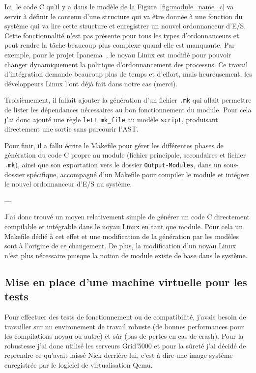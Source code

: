 Ici, le code C qu'il y a dans le modèle de la Figure~\ref{fig:module_name_c} va 
servir à définir le contenu d'une structure qui va être donnée à une fonction 
du système qui va lire cette structure et enregistrer un nouvel ordonnanceur 
d'E/S. Cette fonctionnalité n'est pas présente pour tous les types 
d'ordonnanceurs et peut rendre la tâche beaucoup plus complexe quand elle est 
manquante. Par exemple, pour le projet Ipanema~\cite{lepers2020provable}, le 
noyau Linux est modifié pour pouvoir changer dynamiquement la politique 
d'ordonnancement des processus. Ce travail d'intégration demande beaucoup plus 
de temps et d'effort, mais heureusement, les développeurs Linux l'ont déjà fait 
dans notre cas (merci).

Troisièmement, il fallait ajouter la génération d'un fichier \texttt{.mk} qui 
allait permettre de lister les dépendances nécessaires au bon fonctionnement du 
module. Pour cela j'ai donc ajouté une règle \texttt{let! mk\_file} au modèle 
\texttt{script}, produisant directement une sortie sans parcourir l'AST.

Pour finir, il a fallu écrire le Makefile pour gérer les différentes phases de 
génération du code C propre au module (fichier principale, secondaires et 
fichier \texttt{.mk}), ainsi que son exportation vers le dossier \texttt
{Output-Modules}, dans un sous-dossier spécifique, accompagné d'un Makefile 
pour compiler le module et intégrer le nouvel ordonnanceur d'E/S au système.

\begin{center}
---
\end{center}
    
J'ai donc trouvé un moyen relativement simple de générer un code C directement 
compilable et intégrable dans le noyau Linux en tant que module. Pour cela un 
Makefile dédié à cet effet et une modification de la génération par les modèles 
sont à l'origine de ce changement. De plus, la modification d'un noyau Linux 
n'est plus nécessaire puisque la notion de module existe de base dans le 
système.

\subsection{Mise en place d'une machine virtuelle pour les tests}
\label{qemu}

Pour effectuer des tests de fonctionnement ou de compatibilité, j'avais besoin 
de travailler sur un environement de travail robuste (de bonnes performances 
pour les compilations noyau ou autre) et sûr (pas de pertes en cas de crash). 
Pour la robustesse j'ai donc utilisé les serveurs Grid'5000 et pour la sûreté 
j'ai décidé de reprendre ce qu'avait laissé Nick derrière lui, c'est à dire une 
image système enregistrée par le logiciel de virtualisation Qemu.

